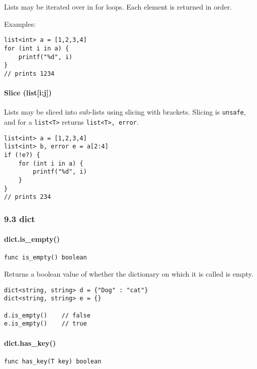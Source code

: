 Lists may be iterated over in for loops. Each element is returned in
order.

Examples:

\begin{verbatim}
list<int> a = [1,2,3,4]
for (int i in a) {
    printf("%d", i)
}
// prints 1234
\end{verbatim}

\paragraph{Slice (list{[}i:j{]})}\label{slice-listij}

Lists may be sliced into sub-lists using slicing with brackets. Slicing
is \texttt{unsafe}, and for a \texttt{list\textless{}T\textgreater{}}
returns \texttt{list\textless{}T\textgreater{}, error}.

\begin{verbatim}
list<int> a = [1,2,3,4]
list<int> b, error e = a[2:4]
if (!e?) {
    for (int i in a) {
        printf("%d", i)
    }
}
// prints 234
\end{verbatim}

\subsubsection*{9.3 dict}\label{dict}

\paragraph{dict.is\_empty()}\label{dict.isux5fempty}

\begin{verbatim}
func is_empty() boolean
\end{verbatim}

Returns a boolean value of whether the dictionary on which it is called
is empty.

\begin{verbatim}
dict<string, string> d = {"Dog" : "cat"}
dict<string, string> e = {}

d.is_empty()    // false
e.is_empty()    // true
\end{verbatim}

\paragraph{dict.has\_key()}\label{dict.hasux5fkey}

\begin{verbatim}
func has_key(T key) boolean
\end{verbatim}

